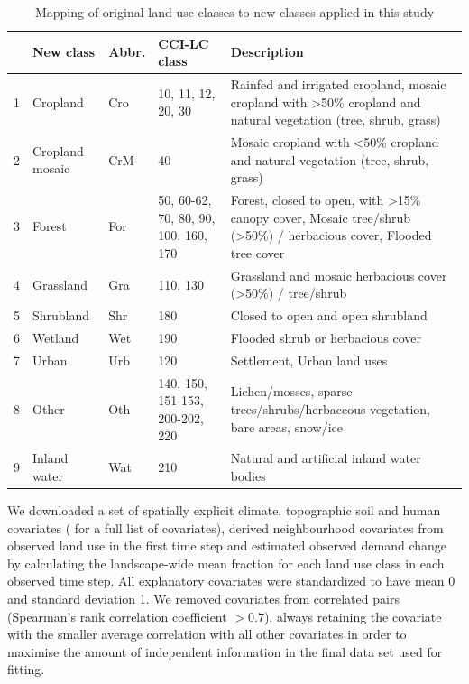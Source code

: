 \documentclass[titlesmallcaps,copyrightpage]{uomthesis}\usepackage[]{graphicx}\usepackage[]{color}
\begin{document}
\begin{table}[htb]
\setlength\tabcolsep{4pt} %
\caption{Mapping of original land use classes to new classes applied in this study}  
\label{ch3:tab2}
\begin{tabularx}{1\textwidth}{@{}llllY@{}}
\toprule 
  & New class & Abbr. & CCI-LC class & Description \\
 & Cropland & Cro & 10, 11, 12, 20, 30 & Rainfed and irrigated cropland, mosaic cropland with \textgreater 50\% cropland and natural vegetation (tree, shrub, grass) \\ 
2 & Cropland mosaic & CrM & 40 & Mosaic cropland with \textless 50\% cropland and natural vegetation (tree, shrub, grass) \\ 
3 & Forest & For & 50, 60-62, 
                70, 80, 90, 100, 160, 170 & Forest, closed to open, with \textgreater 15\% canopy cover, Mosaic tree/shrub (\textgreater 50\%) / herbacious cover, Flooded tree cover \\ 
4 & Grassland & Gra & 110, 130 & Grassland and mosaic herbacious cover (\textgreater 50\%) / tree/shrub \\ 
5 & Shrubland & Shr & 180 & Closed to open and open shrubland \\ 
6 & Wetland & Wet & 190 & Flooded shrub or herbacious cover \\ 
7 & Urban & Urb & 120 & Settlement, Urban land uses \\ 
8 & Other & Oth & 140, 150, 151-153, 200-202, 220 & Lichen/mosses, sparse trees/shrubs/herbaceous vegetation, bare areas, snow/ice \\ 
9 & Inland water & Wat & 210 & Natural and artificial inland water bodies \\
\bottomrule
\end{tabularx}
\end{table}

We downloaded a set of spatially explicit climate, topographic soil and
human covariates ( for a full list of
covariates), derived neighbourhood covariates from observed land use in
the first time step and estimated observed demand change by calculating
the landscape-wide mean fraction for each land use class in each
observed time step. All explanatory covariates were standardized to have
mean 0 and standard deviation 1. We removed covariates from correlated
pairs (Spearman's rank correlation coefficient \(> 0.7\)), always
retaining the covariate with the smaller average correlation with all
other covariates in order to maximise the amount of independent
information in the final data set used for fitting.
\end{document}
